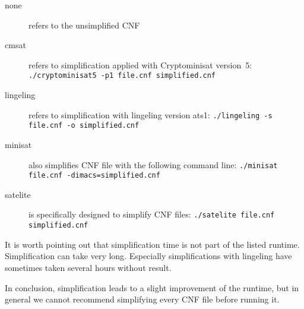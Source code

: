 \begin{description}
\item[none] refers to the unsimplified CNF
\item[cmsat] refers to simplification applied with Cryptominisat version~5: \texttt{./cryptominisat5 -p1 file.cnf simplified.cnf}
\item[lingeling] refers to simplification with lingeling version ats1: \texttt{./lingeling -s file.cnf -o simplified.cnf}
\item[minisat] also simplifies CNF file with the following command line: \texttt{./minisat file.cnf -dimacs=simplified.cnf}
\item[satelite] is specifically designed to simplify CNF files: \texttt{./satelite file.cnf simplified.cnf}
\end{description}

It is worth pointing out that simplification time is not part of the listed
runtime. Simplification can take very long. Especially simplifications with
lingeling have sometimes taken several hours without result.

In conclusion, simplification leads to a slight improvement of the runtime,
but in general we cannot recommend simplifying every CNF file before running it.

